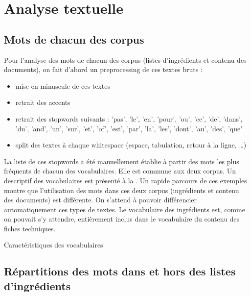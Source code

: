         
    \chapter{Analyse textuelle}

        \section{Mots de chacun des corpus}

        Pour l'analyse des mots de chacun des corpus (listes d'ingrédients et contenu des documents), on fait d'abord un preprocessing de ces textes bruts :
        \begin{itemize}
            \item mise en minuscule de ces textes
            \item retrait des accents
            \item retrait des stopwords suivants : {'pas', 'le', 'en', 'pour', 'ou', 'ce', 'de', 'dans', 'du', 'and', 'un', 'sur', 'et', 'of', 'est', 'par', 'la', 'les', 'dont', 'au', 'des', 'que'}
            \item split des textes à chaque whitespace (espace, tabulation, retour à la ligne, \dots)
        \end{itemize}
        La liste de ces stopwords a été manuellement établie à partir des mots les plus fréquents de chacun des vocabulaires.
        Elle est commune aux deux corpus.
        Un descriptif des vocabulaires est présenté à la .
        Un rapide parcours de ces exemples montre que l'utilisation des mots dans ces deux corpus (ingrédients et contenu des documents) est différente.
        On s'attend à pouvoir différencier automatiquement ces types de textes.
        Le vocabulaire des ingrédients est, comme on pouvait s'y attendre, entièrement inclus dans le vocabulaire du contenu des fiches techniques.
        
        {\renewcommand{\arraystretch}{1.5}%
        \begin{table}[htbp]
            \begin{center}
            {\scriptsize
            
            }
            \caption{Caractéristiques des vocabulaires}
            \label{tbl:vocabularies}
            \end{center}
        \end{table}
        }

        \section{Répartitions des mots dans et hors des listes d'ingrédients}
        \label{word_scores}
        
